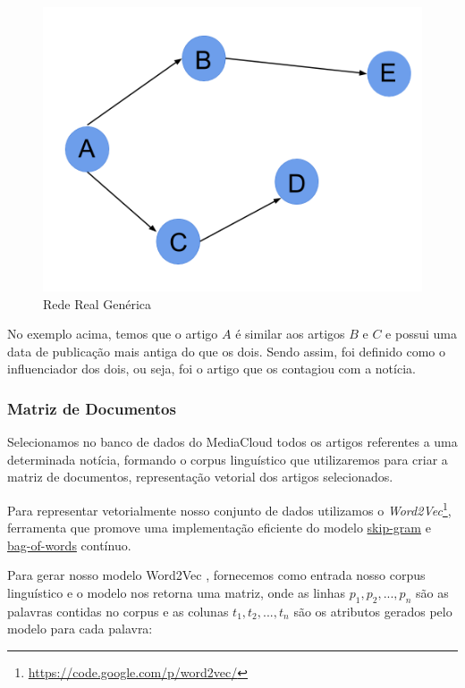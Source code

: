 \documentclass[a4paper,12pt]{article}
\begin{document}
\begin{figure}[h]
 \centering
 \includegraphics[scale=0.2]{./rede1.png}
 \caption{Rede Real Genérica}
\end{figure}

No exemplo acima, temos que o artigo $A$ é similar aos artigos $B$ e $C$ e possui uma data de publicação mais antiga do que os dois. 
Sendo assim, foi definido como o influenciador dos dois, ou seja, foi o artigo que os contagiou com a notícia.

\pagebreak
\subsubsection{Matriz de Documentos}

Selecionamos no banco de dados do MediaCloud todos os artigos referentes a uma determinada notícia, formando o corpus linguístico que 
utilizaremos para criar a matriz de documentos, representação vetorial dos artigos selecionados.

Para representar vetorialmente nosso conjunto de dados utilizamos o \textit{Word2Vec}\footnote[1]{\url{https://code.google.com/p/word2vec/}}, ferramenta que promove uma implementação 
eficiente do modelo \hyperref[sec:nlp]{skip-gram} e \hyperref[sec:nlp]{bag-of-words} contínuo.

Para gerar nosso modelo Word2Vec , fornecemos como entrada nosso corpus linguístico
e o modelo nos retorna uma matriz, onde as linhas $p_{1},p_{2},...,p_{n}$ são as palavras contidas no corpus e as colunas $t_{1},t_{2},...,t_{n}$
são os atributos gerados pelo modelo para cada palavra:
 
\end{document}

